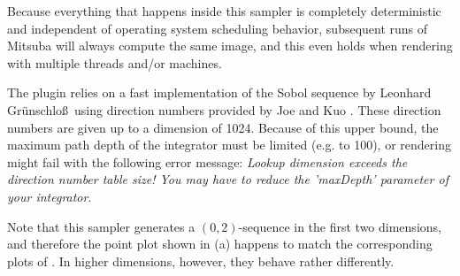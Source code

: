 Because everything that happens inside this sampler is completely
deterministic and independent of operating system scheduling behavior, subsequent
runs of Mitsuba will always compute the same image, and this even holds when rendering
with multiple threads and/or machines.

The plugin relies on a fast implementation of the Sobol sequence by Leonhard
Gr\"unschlo\ss\ using direction numbers provided by Joe and Kuo
\cite{Joe2008Constructing}.
These direction numbers are given up to a dimension of 1024. Because of this
upper bound, the maximum path depth of the integrator must be limited (e.g. to 100), or
rendering might fail with the following error message: \emph{Lookup dimension
exceeds the direction number table size! You may have to reduce the 'maxDepth'
parameter of your integrator}.

Note that this sampler generates a $(0,2)$-sequence in the first two dimensions,
and therefore the point plot shown in (a) happens to match the corresponding plots of
. In higher dimensions, however, they behave rather differently.

